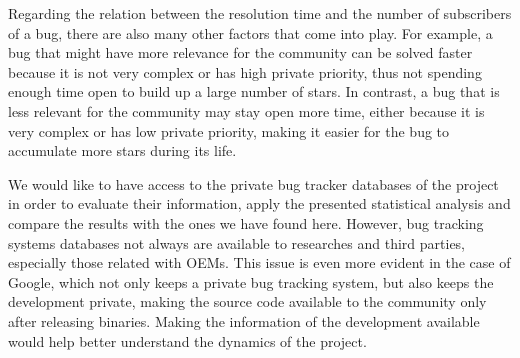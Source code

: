 \documentclass[10pt, conference, compsocconf]{IEEEtran}
\begin{document}
Regarding the relation between the resolution time and the number of subscribers of a bug, there are also many other factors that come into play. For example, a bug that might have more relevance for the community can be solved faster because it is not very complex or has high private priority, thus not spending enough time open to build up a large number of stars. In contrast, a bug that is less relevant for the community may stay open more time, either because it is very complex or has low private priority, making it easier for the bug to accumulate more stars during its life.

We would like to have access to the private bug tracker databases of the project in order to evaluate their information, apply the presented statistical analysis and compare the results with the ones we have found here. However, bug tracking systems databases not always are available to researches and third parties, especially those related with OEMs. This issue is even more evident in the case of Google, which not only keeps a private bug tracking system, but also keeps the development private, making the source code available to the community only after releasing binaries. Making the information of the development available would help better  understand the dynamics of the project.




%
%
\end{document}
